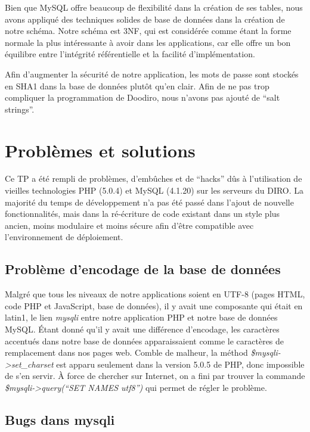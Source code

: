 \documentclass[10pt]{article}
\begin{document}
Bien que MySQL offre beaucoup de flexibilité dans la création de ses
tables, nous avons appliqué des techniques solides de base de données
dans la création de notre schéma. Notre schéma est 3NF, qui est
considérée comme étant la forme normale la plus intéressante à avoir
dans les applications, car elle offre un bon équilibre entre
l'intégrité référentielle et la facilité d'implémentation.

Afin d'augmenter la sécurité de notre application, les mots de passe
sont stockés en SHA1 dans la base de données plutôt qu'en clair.  Afin
de ne pas trop compliquer la programmation de Doodiro, nous n'avons
pas ajouté de ``salt strings''.


\section{Problèmes et solutions}

Ce TP a été rempli de problèmes, d'embûches et de ``hacks'' dûs à
l'utilisation de vieilles technologies PHP (5.0.4) et MySQL (4.1.20)
sur les serveurs du DIRO.  La majorité du temps de développement n'a
pas été passé dans l'ajout de nouvelle fonctionnalités, mais dans la
ré-écriture de code existant dans un style plus ancien, moins
modulaire et moins sécure afin d'être compatible avec l'environnement
de déploiement.

\subsection{Problème d'encodage de la base de données}

Malgré que tous les niveaux de notre applications soient en UTF-8
(pages HTML, code PHP et JavaScript, base de données), il y avait une
composante qui était en latin1, le lien {\em mysqli} entre notre
application PHP et notre base de données MySQL. Étant donné qu'il y
avait une différence d'encodage, les caractères accentués dans notre
base de données apparaissaient comme le caractères de remplacement
dans nos pages web. Comble de malheur, la méthod {\em
  \$mysqli->set\_charset} est apparu seulement dans la version 5.0.5
de PHP, donc impossible de s'en servir. À force de chercher sur
Internet, on a fini par trouver la commande {\em \$mysqli->query(``SET
  NAMES utf8'')} qui permet de régler le problème.

\subsection{Bugs dans mysqli}
\end{document}
